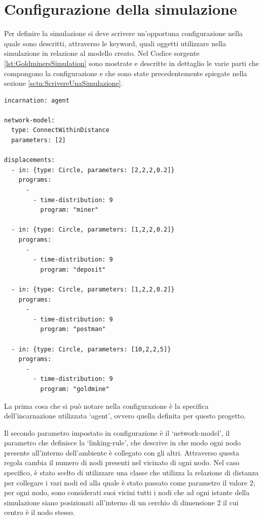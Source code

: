 \section{Configurazione della simulazione}
Per definire la simulazione si deve scrivere un'opportuna configurazione nella quale sono descritti, attraverso le keyword, quali oggetti utilizzare nella simulazione in relazione al modello creato. Nel Codice sorgente \ref{lst:GoldminersSimulation} sono mostrate e descritte in dettaglio le varie parti che compongono la configurazione e che sono state precedentemente spiegate nella sezione \ref{sctn:ScrivereUnaSimulazione}.

\medskip
\begin{lstlisting}[firstnumber=1,label={lst:GoldminersSimulation},caption={Configurazione simulazione Goldminers}]
incarnation: agent

network-model:
  type: ConnectWithinDistance
  parameters: [2]

displacements:
  - in: {type: Circle, parameters: [2,2,2,0.2]}
    programs:
      -
        - time-distribution: 9
          program: "miner"

  - in: {type: Circle, parameters: [1,2,2,0.2]}
    programs:
      -
        - time-distribution: 9
          program: "deposit"

  - in: {type: Circle, parameters: [1,2,2,0.2]}
    programs:
      -
        - time-distribution: 9
          program: "postman"

  - in: {type: Circle, parameters: [10,2,2,5]}
    programs:
      -
        - time-distribution: 9
          program: "goldmine"
\end{lstlisting}

La prima cosa che si può notare nella configurazione è la specifica dell'incarnazione utilizzata `agent', ovvero quella definita per questo progetto.

Il secondo parametro impostato in configurazione è il `network-model', il parametro che definisce la `linking-rule', che descrive in che modo ogni nodo presente all'interno dell'ambiente è collegato con gli altri. Attraverso questa regola cambia il numero di nodi presenti nel vicinato di ogni nodo. Nel caso specifico, è stato scelto di utilizzare una classe che utilizza la relazione di distanza per collegare i vari nodi ed alla quale è stato passato come parametro il valore 2; per ogni nodo, sono considerati suoi vicini tutti i nodi che ad ogni istante della simulazione siano posizionati all'interno di un cerchio di dimensione 2 il cui centro è il nodo stesso.

